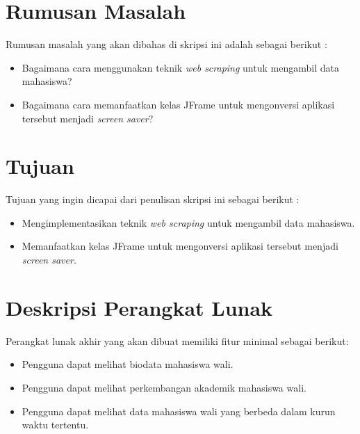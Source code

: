 \documentclass[a4paper,twoside]{article}
\begin{document}
\section{Rumusan Masalah}
Rumusan masalah yang akan dibahas di skripsi ini adalah sebagai berikut :
\begin{itemize}
	\item Bagaimana cara menggunakan teknik \textit{web scraping} untuk mengambil data mahasiswa?
	\item Bagaimana cara memanfaatkan kelas JFrame untuk mengonversi aplikasi tersebut menjadi \textit{screen saver}?
\end{itemize}   

\section{Tujuan}
Tujuan yang ingin dicapai dari penulisan skripsi ini sebagai berikut :
\begin{itemize}
    \item Mengimplementasikan teknik \textit{web scraping} untuk mengambil data mahasiswa.
    \item Memanfaatkan kelas JFrame untuk mengonversi aplikasi tersebut menjadi \textit{screen saver}.
\end{itemize}

\section{Deskripsi Perangkat Lunak}
Perangkat lunak akhir yang akan dibuat memiliki fitur minimal sebagai berikut:
\begin{itemize}
	\item Pengguna dapat melihat biodata mahasiswa wali.
	\item Pengguna dapat melihat perkembangan akademik mahasiswa wali.
	\item Pengguna dapat melihat data mahasiswa wali yang berbeda dalam kurun waktu tertentu.
\end{itemize}
\end{document}
